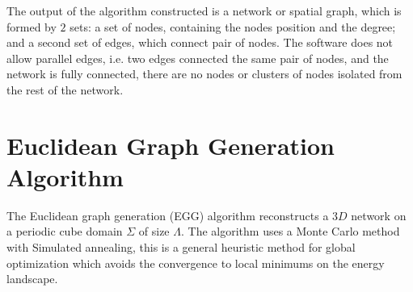 The output of the algorithm constructed is a network or spatial \gls{graph}, which is formed
by $2$ sets: a set of nodes, containing the nodes
position and the degree; and a second set of edges, which connect pair of
nodes. The software
does not allow parallel edges, i.e. two edges connected the same pair of nodes,
and the network is fully connected, there are no nodes or clusters of nodes
isolated from the rest of the network.
\section{Euclidean Graph Generation Algorithm}
The Euclidean graph generation (EGG) algorithm reconstructs a $3D$
network on a periodic cube domain $\Sigma$ of size $\Lambda$. The algorithm uses
a Monte Carlo method with Simulated annealing, this is a general heuristic
method for global optimization which avoids the convergence to local minimums on
the energy landscape.

